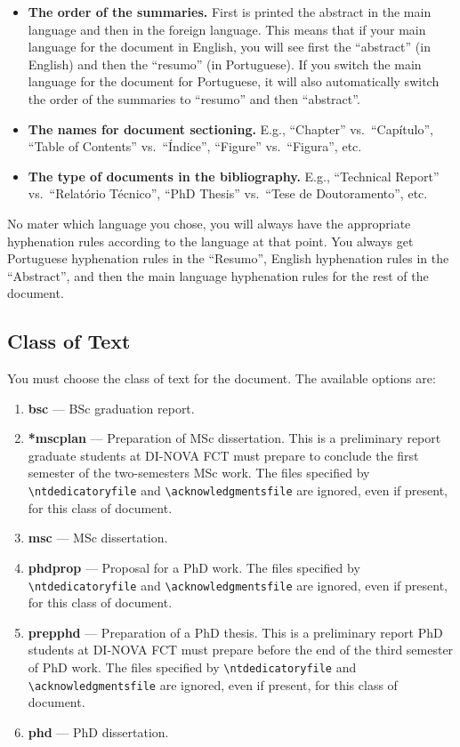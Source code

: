 \begin{itemize}
  \item \textbf{The order of the summaries.} First is printed the abstract in the main language and then in the foreign language. This means that if your main language for the document in English, you will see first the “abstract” (in English) and then the “resumo” (in Portuguese). If you switch the main language for the document for Portuguese, it will also automatically switch the order of the summaries to “resumo” and then “abstract”.
  \item \textbf{The names for document sectioning.} E.g., ``Chapter'' vs.\ ``Capítulo'', ``Table of Contents'' vs.\ ``Índice'', ``Figure'' vs.\ ``Figura'', etc.
  \item \textbf{The type of documents in the bibliography.} E.g., ``Technical Report'' vs.\ ``Relatório Técnico'', ``PhD Thesis'' vs.\ ``Tese de Doutoramento'', etc.
\end{itemize}

No mater which language you chose, you will always have the appropriate hyphenation rules according to the language at that point. You always get Portuguese hyphenation rules in the ``Resumo'', English hyphenation rules in the ``Abstract'', and then the main language hyphenation rules for the rest of the document.




\subsection{Class of Text}
\label{sub:class_of_text}

You must choose the class of text for the document. The available options are:

\begin{enumerate}
  \item \textbf{bsc} --- BSc graduation report.
  \item \textbf{*mscplan} --- Preparation of MSc dissertation. This is a preliminary report graduate students at DI-NOVA FCT must prepare to conclude the first semester of the two-semesters MSc work. The files specified by \verb!\ntdedicatoryfile! and \verb!\acknowledgmentsfile! are ignored, even if present, for this class of document.
  \item \textbf{msc} --- MSc dissertation.
  \item \textbf{phdprop} ---  Proposal for a PhD work. The files specified by \verb!\ntdedicatoryfile! and \verb!\acknowledgmentsfile! are ignored, even if present, for this class of document.
  \item \textbf{prepphd} ---  Preparation of a PhD thesis. This is a preliminary report PhD students at DI-NOVA FCT must prepare before the end of the third semester of PhD work. The files specified by \verb!\ntdedicatoryfile! and \verb!\acknowledgmentsfile! are ignored, even if present, for this class of document.
  \item \textbf{phd} --- PhD dissertation.
\end{enumerate}

